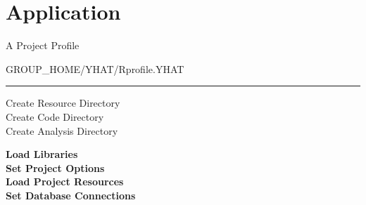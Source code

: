 \documentclass{beamer}
\begin{document}
\section*{Application}

\begin{frame}{A Project Profile}

\begin{center} GROUP\_HOME/YHAT/Rprofile.YHAT\\ \end{center}
\begin{center}
\rule{4cm}{0.6pt}
\end{center}

\begin{center}
Create Resource Directory\\
Create Code Directory \\ 
Create Analysis Directory\\
\end{center}

\textbf{Load Libraries\\}
\textbf{Set Project Options\\}
\textbf{Load Project Resources\\}
\textbf{Set Database Connections\\}

\end{frame}
\end{document}
